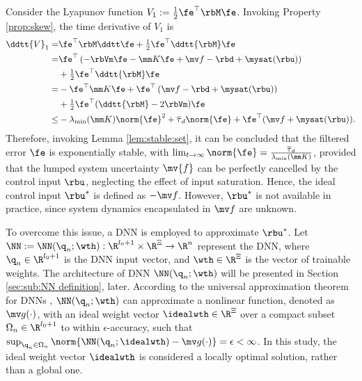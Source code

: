 \documentclass[journal]{IEEEtran}
\begin{document}
Consider the Lyapunov function $V_1:= \tfrac{1}{2}\fe^\top \rbM\fe$. 
Invoking Property \ref{prop:skew}, the time derivative of $V_1$ is
\begin{equation}
    \begin{aligned}
        \ddtt{V}_1
        =&
        \fe^\top \rbM \ddtt \fe
        +
        \tfrac{1}{2}\fe^\top \ddtt{\rbM}\fe
        \\
        =&
        \fe^\top 
        \left(
            -\rbVm \fe -\mm K \fe + \mv f
            -\rbd + \mysat(\rbu)
        \right)
        \\
        &
        +
        \tfrac{1}{2}
        \fe^\top \ddtt{\rbM}\fe
        \\
        =&
        -
        \fe^\top \mm K \fe 
        +
        \fe^\top 
        \left(
            \mv f
            -\rbd
            +\mysat(\rbu)
        \right)
        \\
        &
        +
        \tfrac{1}{2}
        \fe^\top(\ddtt{\rbM}- 2\rbVm)\fe
        \\
        \le&
        -\lambda_{\min}(\mm K)\norm{\fe}^2
        +
        \overline\tau_d\norm{\fe}
        +
        \fe^\top (\mv f+\mysat(\rbu))
        .
    \end{aligned}
    \label{eq:lya1:dot1}
\end{equation} 
Therefore, invoking Lemma \ref{lem:stable:set}, it can be concluded that the filtered error $\fe$ is exponentially stable, with $\lim_{t\to\infty}\norm{\fe}=\tfrac{\overline\tau_d}{\lambda_{\min}(\mm K)}$, provided that the lumped system uncertainty $\mv{f}$ can be perfectly cancelled by the control input $\rbu$, neglecting the effect of input saturation.
Hence, the ideal control input $\rbu^*$ is defined as $-\mv f$.
However, $\rbu^*$ is not available in practice, since system dynamics encapsulated in $\mv f$ are unknown.

To overcome this issue, a DNN is employed to approximate $\rbu^*$.
Let $\NN:=\NN({\q}_n;\wth): \R^{l_0+1}\times\R^{\Xi}\to\R^{n}$ represent the DNN, where ${\q}_n\in\R^{l_0+1}$ is the DNN input vector, and $\wth\in\R^{\Xi}$ is the vector of trainable weights.
The architecture of DNN $\NN({\q}_n;\wth)$ will be presented in Section \ref{sec:sub:NN definition}, later.
According to the universal approximation theorem for DNNs \cite{Kidger:2020aa}, $\NN({\q}_n;\wth)$ can approximate a nonlinear function, denoted as $\mv g(\cdot)$, with an ideal weight vector $\idealwth\in\R^\Xi$ over a compact subset $\Omega_{n}\in\R^{l_0+1}$ to within $\epsilon$-accuracy, such that $\sup_{{\q}_n\in\Omega_{n}}\norm{ \NN({\q}_n;\idealwth) - \mv g(\cdot)} = \epsilon < \infty$.
In this study, the ideal weight vector $\idealwth$ is considered a locally optimal solution, rather than a global one.
\end{document}
